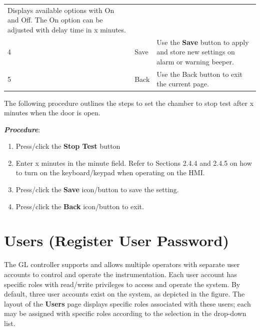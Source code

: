 \begin{longtable}[]{@{}lll@{}}
\begin{minipage}[t]{0.65\columnwidth}
Displays available options with On and Off. The On option can be
adjusted with delay time in x minutes.\strut
\end{minipage}\tabularnewline
\begin{minipage}[t]{0.04\columnwidth}\raggedright
4\strut
\end{minipage} & \begin{minipage}[t]{0.23\columnwidth}\raggedright
Save\strut
\end{minipage} & \begin{minipage}[t]{0.65\columnwidth}\raggedright
Use the \textbf{Save} button to apply and store new settings on alarm or
warning beeper.\strut
\end{minipage}\tabularnewline
\begin{minipage}[t]{0.04\columnwidth}\raggedright
5\strut
\end{minipage} & \begin{minipage}[t]{0.23\columnwidth}\raggedright
Back\strut
\end{minipage} & \begin{minipage}[t]{0.65\columnwidth}\raggedright
Use the Back button to exit the current page.\strut
\end{minipage}\tabularnewline
\bottomrule
\end{longtable}

The following procedure outlines the steps to set the chamber to stop
test after x minutes when the door is open.

\textbf{\emph{Procedure}}:

\begin{enumerate}
\def\labelenumi{\arabic{enumi}.}
\tightlist
\item
  Press/click the \textbf{Stop Test} button
\item
  Enter x minutes in the minute field. Refer to Sections 2.4.4 and 2.4.5
  on how to turn on the keyboard/keypad when operating on the HMI.\\
\item
  Press/click the \textbf{Save} icon/button to save the setting.
\item
  Press/click the \textbf{Back} icon/button to exit.
\end{enumerate}


\section{Users (Register User
Password)}

The GL controller supports and allows multiple operators with separate
user accounts to control and operate the instrumentation. Each user
account has specific roles with read/write privileges to access and
operate the system. By default, three user accounts exist on the system,
as depicted in the figure. The layout of the \textbf{Users} page
displays specific roles associated with these users; each may be
assigned with specific roles according to the selection in the drop-down
list.

